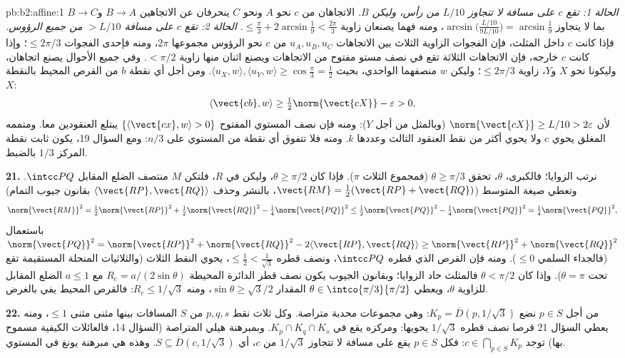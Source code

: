 \begin{solution}{pb:b2:affine:1}
\emph{الحالة 1: تقع $c$ على مسافة لا تتجاوز $L/10$ من رأس، وليكن
$B$.} الاتجاهان من $c$ نحو $A$ ونحو $C$ ينحرفان عن
الاتجاهين $B \to A$ و$B \to C$ بما لا يتجاوز $\arcsin\bigl(\tfrac{L/10}{9L/10}\bigr) = \arcsin\tfrac19$، ومنه فهما يصنعان
زاوية $\leq \tfrac\pi3 + 2\arcsin\tfrac19 <
\tfrac{2\pi}3$. \emph{الحالة 2: تقع $c$ على مسافة $> L/10$ من جميع
الرؤوس.} فإذا كانت $c$ داخل المثلث، فإن الفجوات الزاوية الثلاث
بين الاتجاهات $u_A, u_B, u_C$ من $c$ نحو الرؤوس مجموعها $2\pi$، ومنه
فإحدى الفجوات $\leq 2\pi/3$؛ وإذا كانت $c$ خارجه، فإن الاتجاهات الثلاثة
تقع في نصف مستو مفتوح من الاتجاهات ويصنع اثنان منها زاوية $<
\pi/2$.
وفي جميع الأحوال يصنع اتجاهان، وليكونا نحو $X$ و$Y$، زاوية
$\leq 2\pi/3$؛ وليكن $w$ منصفهما الواحدي، بحيث $\langle u_X, w\rangle, \langle u_Y, w\rangle \geq
\cos\tfrac\pi3 = \tfrac12$. ومن أجل أي نقطة
$b$ من القرص المحيط بالنقطة $X$:
\[
\langle \vect{cb}, w\rangle \geq
\tfrac12\norm{\vect{cX}} - \varepsilon > 0,
\]
لأن $\norm{\vect{cX}} \geq L/10 > 2\varepsilon$ (وبالمثل من أجل $Y$): ومنه فإن نصف المستوي المفتوح
$\{\langle \vect{cx},
w\rangle > 0\}$ يبتلع العنقودين معا. ومتممه المغلق يحوي $c$ ولا يحوي أكثر
من نقط العنقود الثالث وعددها $k$. ومنه فلا تتفوق أي نقطة من
المستوي على $n/3$: ومع السؤال 19، يكون ثابت نقطة المركز $1/3$
بالضبط.

\textbf{21.} نرتب الزوايا؛ فالكبرى، $\theta$، تحقق $\theta \geq \pi/3$ (فمجموع
الثلاث $\pi$). فإذا كان $\theta \geq \pi/2$، وليكن في $R$، فلتكن $M$
منتصف الضلع المقابل $\intcc PQ$. وتعطي صيغة المتوسط ($\vect{RM}
= \tfrac12(\vect{RP} + \vect{RQ})$، بالنشر
وحذف $\langle\vect{RP}, \vect{RQ}\rangle$ بقانون جيوب التمام)
\[
\norm{\vect{RM}}^2 = \tfrac12\norm{\vect{RP}}^2 +
\tfrac12\norm{\vect{RQ}}^2 - \tfrac14\norm{\vect{PQ}}^2 \leq
\tfrac12\norm{\vect{PQ}}^2 - \tfrac14\norm{\vect{PQ}}^2 =
\tfrac14\norm{\vect{PQ}}^2,
\]
باستعمال $\norm{\vect{PQ}}^2 = \norm{\vect{RP}}^2 +
\norm{\vect{RQ}}^2 - 2\langle\vect{RP}, \vect{RQ}\rangle \geq
\norm{\vect{RP}}^2 + \norm{\vect{RQ}}^2$ (فالجداء السلمي $\leq 0$). ومنه فإن القرص الذي قطره
$\intcc PQ$، ونصف قطره $\leq \tfrac12 < \tfrac1{\sqrt3}$، يحوي النقط الثلاث (والثلاثيات المنحلة
المستقيمة تقع تحت $\theta = \pi$). وإذا كان $\theta < \pi/2$ فالمثلث حاد الزوايا؛
وبقانون الجيوب يكون نصف قطر الدائرة المحيطة $R_c = a/(2\sin\theta)$ مع $a \leq 1$ الضلع
المقابل للزاوية $\theta$، ويعطي $\theta \in
\intco{\pi/3}{\pi/2}$ المقدار $\sin\theta \geq \sqrt3/2$، ومنه $R_c \leq 1/\sqrt3$:
فالقرص المحيط يفي بالغرض.

\textbf{22.} من أجل $p \in S$ نضع $K_p = \overline D(p,
1/\sqrt3)$: وهي مجموعات محدبة متراصة.
وكل ثلاث نقط $p, q, s$ من $S$ المسافات بينها مثنى مثنى $\leq 1$،
ومنه يعطي السؤال 21 قرصا نصف قطره $1/\sqrt3$ يحويها: ومركزه يقع في
$K_p \cap K_q \cap K_s$. وبمبرهنة هيلي المتراصة (السؤال 14، فالعائلات الكيفية مسموح
بها) توجد $c \in \bigcap_{p\in
S}K_p$: فكل $p \in S$ يقع على مسافة لا تتجاوز $1/\sqrt3$ من
$c$، أي $S
\subseteq \overline D(c, 1/\sqrt3)$. وهذه هي مبرهنة يونغ في المستوي.


\end{solution}
